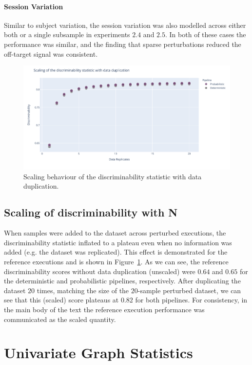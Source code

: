 \documentclass[fleqn,10pt]{SelfArx} %
\newcommand{\new}[1]{{#1}}
\begin{document}
\paragraph{Session Variation}
Similar to subject variation, the session variation was also modelled across either both or a single subsample \new{in
experiments $2.4$ and $2.5$}. In both of these cases the performance was similar, and the finding that \new{sparse}
perturbations reduced the off-target signal was consistent.

\begin{figure}[ht]\centering
\includegraphics[width=0.8\linewidth]{figures/figS2_discrim_scaling.pdf}
\caption{Scaling behaviour of the discriminability statistic with data duplication.}
\label{fig:discrim_scaling}
\end{figure}

\subsection{Scaling of discriminability with N}
When samples were added to the dataset across perturbed executions, the discriminability statistic inflated to a
plateau even when no information was added (e.g. the dataset was replicated). This effect is demonstrated for the
reference executions and is shown in Figure~\ref{fig:discrim_scaling}. As we can see, the reference discriminability
scores without data duplication (unscaled) were $0.64$ and $0.65$ for the deterministic and probabilistic pipelines,
respectively. After duplicating the dataset $20$ times, matching the size of the $20$-sample perturbed dataset, we
can see that this (scaled) score plateaus at $0.82$ for both pipelines. For consistency, in the main body of the text
the reference execution performance was communicated as the scaled quantity.



\clearpage
\section{Univariate Graph Statistics}
\label{supsec:univar}
\end{document}
